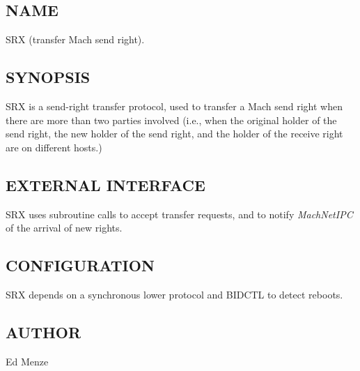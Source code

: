 %
%
%

\subsection*{NAME}

\noindent SRX (transfer Mach send right).


\subsection*{SYNOPSIS}

SRX is a send-right transfer protocol, used to transfer a Mach send
right when there are more than two parties involved (i.e., when the
original holder of the send right, the new holder of the send right,
and the holder of the receive right are on different hosts.)


\noindent
\subsection*{EXTERNAL INTERFACE}

SRX uses subroutine calls to accept transfer requests, and to notify 
{\em MachNetIPC} of the arrival of new rights.

\subsection*{CONFIGURATION}

SRX depends on a synchronous lower protocol and BIDCTL to detect
reboots.


\subsection*{AUTHOR}

\noindent Ed Menze
